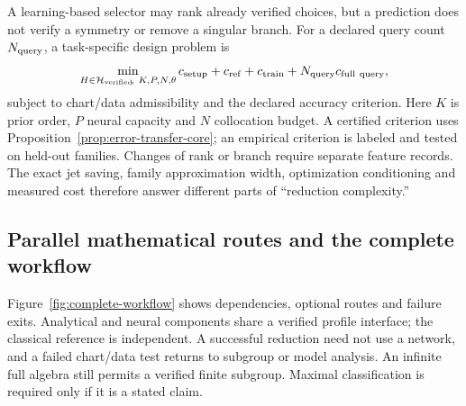 \documentclass[11pt]{article}
\theoremstyle{definition}
\begin{document}
A learning-based selector may rank already verified choices, but a prediction
does not verify a symmetry or remove a singular branch. For a declared query
count $N_{\rm query}$, a task-specific design problem is
\begin{equation}
 \min_{\substack{H\in\mathcal H_{\rm verified}\!,\ K,P,N,\theta}}
  c_{\rm setup}+c_{\rm ref}+c_{\rm train}
          +N_{\rm query}c_{\rm full\ query},
 \label{eq:reduction-design}
\end{equation}
subject to chart/data admissibility and the declared accuracy criterion.
Here $K$ is prior order, $P$ neural capacity and $N$ collocation budget.
A certified criterion uses Proposition~\ref{prop:error-transfer-core}; an
empirical criterion is labeled and tested on held-out families. Changes of
rank or branch require separate feature records. The exact jet saving,
family approximation width, optimization conditioning and measured cost
therefore answer different parts of ``reduction complexity.''

\subsection{Parallel mathematical routes and the complete workflow}
\label{sec:workflow-core}
Figure~\ref{fig:complete-workflow} shows dependencies, optional routes and
failure exits. Analytical and neural components share a verified profile
interface; the classical reference is independent. A successful reduction
need not use a network, and a failed chart/data test returns to subgroup or
model analysis. An infinite full algebra still permits a verified finite
subgroup. Maximal classification is required only if it is a stated claim.
\end{document}
